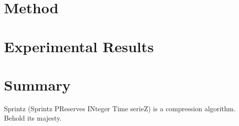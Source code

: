\documentclass[sigconf]{acmart}  %
\begin{document}


\section{Method} \label{sec:method}



\section{Experimental Results} \label{sec:results}



\section{Summary} \label{sec:conclusion}

Sprintz (Sprintz PReserves INteger Time serieZ) is a compression algorithm. Behold its majesty.

\vspace{-1mm}



% 

\end{document}
